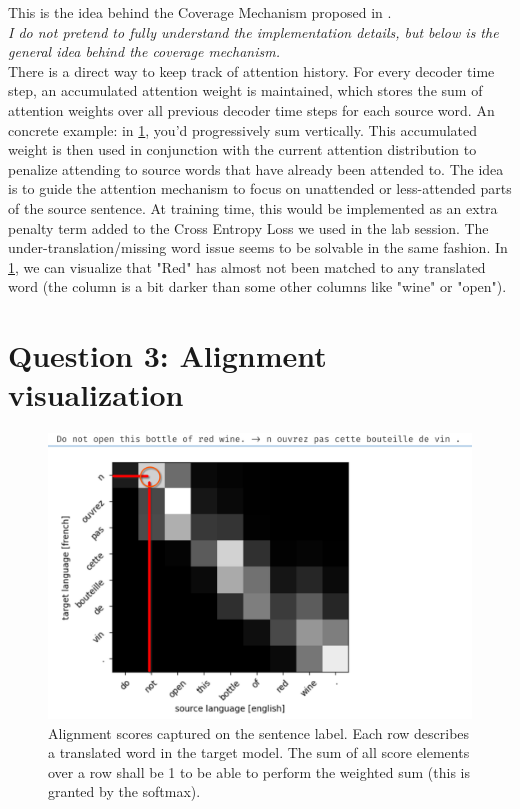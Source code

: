 \documentclass[a4paper]{article}
\begin{document}
This is the idea behind the Coverage Mechanism proposed in \cite{modeling_coverage}.\\
\textit{I do not pretend to fully understand the implementation details, but below is the general idea behind the coverage mechanism.}\\
There is a direct way to keep track of attention history. For every decoder time step, an accumulated attention weight is maintained, which stores the sum of attention weights over all previous decoder time steps for each source word. An concrete example: in \ref{fig:attention}, you'd progressively sum vertically. This accumulated weight is then used in conjunction with the current attention distribution to penalize attending to source words that have already been attended to. The idea is to guide the attention mechanism to focus on unattended or less-attended parts of the source sentence. At training time, this would be implemented as an extra penalty term added to the Cross Entropy Loss we used in the lab session. 
The under-translation/missing word issue seems to be solvable in the same fashion. In \ref{fig:attention}, we can visualize that "Red" has almost not been matched to any translated word (the column is a bit darker than some other columns like "wine" or "open").

\newpage
\section{Question 3: Alignment visualization}

\begin{figure}[ht]
    \centering
	\includegraphics[width=.8\textwidth]{figures/bottle_of_wine.png}
	\caption{Alignment scores captured on the sentence label. Each row describes a translated word in the target model. The sum of all score elements over a row shall be 1 to be able to perform the weighted sum (this is granted by the softmax).\label{fig:attention}}
\end{figure}
\end{document}
